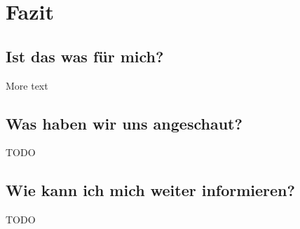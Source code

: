\documentclass[
    ngerman,
    accentcolor=3b,
    fontsize= 12pt,
    a4paper,
    aspectratio=169,
    colorback=true,
    fancy_row_colors,
    leqno,
    fleqn,
    boxarc=3pt,
    fleqn,
    main,
    design=2008,
]{algoslides}
\begin{document}
    \section{Fazit}\label{2}\label{Fazit}
    \subsection{Ist das was für mich?}
    \begin{frame}
        \slidehead{}
        More text
    \end{frame}
    \subsection{Was haben wir uns angeschaut?}
    \begin{frame}[<+(1)->]
        \slidehead{}
        TODO
    \end{frame}
    \subsection{Wie kann ich mich weiter informieren?}
    \begin{frame}[<+(1)->]
        \slidehead{}
        TODO
    \end{frame}
\end{document}
